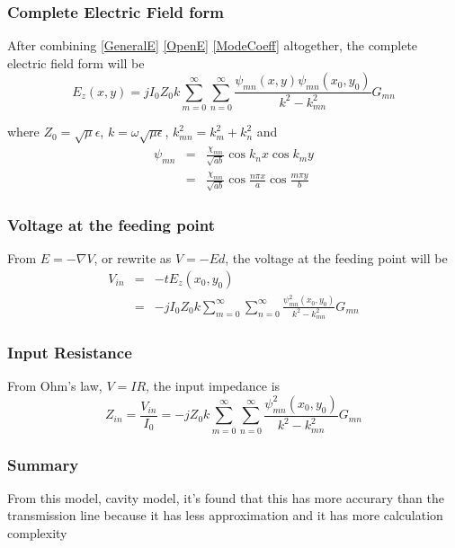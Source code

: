 \documentclass[11pt,a4paper]{article}
\begin{document}
        \subsubsection{Complete Electric Field form}
          \indent After combining \ref{GeneralE} \ref{OpenE} \ref{ModeCoeff} altogether, the complete electric field form will be
          \begin{equation}
            E_z(x,y) = jI_0Z_0k \sum_{m=0}^{\infty} \sum_{n=0}^{\infty} \frac{\psi_{mn}(x,y)\psi_{mn}(x_0,y_0)}{k^2-k_{mn}^2}G_{mn}
          \end{equation}
        
          \indent where $Z_0 = \sqrt{\mu}{\epsilon}$, $k = \omega\sqrt{\mu\epsilon}$, $k_{mn}^2 = k_{m}^2 + k_{n}^2$ and
          \begin{eqnarray}
            \psi_{mn} &=& \frac{\chi_{mn}}{\sqrt{ab}}\cos{k_nx}\cos{k_my} \nonumber \\
                      &=& \frac{\chi_{mn}}{\sqrt{ab}}\cos{\frac{n\pi x}{a}}\cos{\frac{m\pi y}{b}}
          \end{eqnarray}
        \subsubsection{Voltage at the feeding point}
          \indent From $E = - \nabla V$, or rewrite as $V = -Ed$, the voltage at the feeding point will be
          \begin{eqnarray}
              V_{in} &=& -tE_z(x_0,y_0) \nonumber \\
                    &=& -jI_0Z_0k \sum_{m=0}^{\infty} \sum_{n=0}^{\infty} \frac{\psi_{mn}^2(x_0,y_0)}{k^2-k_{mn}^2} G_{mn}
          \end{eqnarray}
        \subsubsection{Input Resistance}
          \indent From Ohm's law, $V = IR$, the input impedance is
          \begin{equation}
            Z_{in} = \frac{V_{in}}{I_0} = -jZ_0k \sum_{m=0}^{\infty} \sum_{n=0}^{\infty} \frac{\psi_{mn}^2(x_0,y_0)}{k^2-k_{mn}^2} G_{mn}
          \end{equation}
        
        \subsubsection{Summary}
          \indent From this model, cavity model, it's found that this has more accurary than the transmission line
                  because it has less approximation and it has more calculation complexity
        
\end{document}

